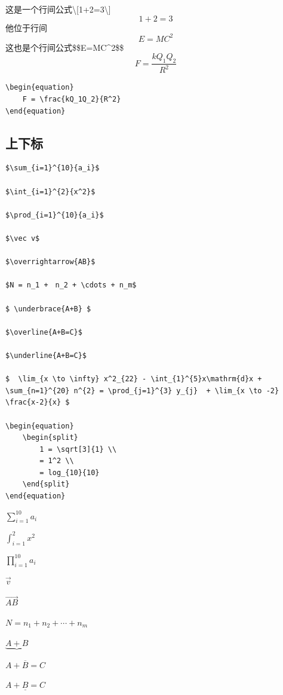 \documentclass{article}
\begin{document}
	\noindent 这是一个行间公式\textbackslash [1+2=3\textbackslash]\\
	\[1+2=3\] 他位于行间
	$$E=MC^2$$
	这也是个行间公式\$\$E=MC\^{}2\$\$
	\begin{equation}
		F = \frac{kQ_1Q_2}{R^2}
	\end{equation}
	\begin{lstlisting}
\begin{equation}
	F = \frac{kQ_1Q_2}{R^2}
\end{equation}
	\end{lstlisting}
	

	\subsection{上下标}
	\begin{lstlisting}
$\sum_{i=1}^{10}{a_i}$

$\int_{i=1}^{2}{x^2}$

$\prod_{i=1}^{10}{a_i}$

$\vec v$

$\overrightarrow{AB}$

$N = n_1 +　n_2 + \cdots + n_m$

$ \underbrace{A+B} $

$\overline{A+B=C}$

$\underline{A+B=C}$

$  \lim_{x \to \infty} x^2_{22} - \int_{1}^{5}x\mathrm{d}x + \sum_{n=1}^{20} n^{2} = \prod_{j=1}^{3} y_{j}  + \lim_{x \to -2} \frac{x-2}{x} $

\begin{equation}
	\begin{split}
		1 = \sqrt[3]{1} \\ 
		= 1^2 \\
		= log_{10}{10}
	\end{split}
\end{equation}
	\end{lstlisting}
	
	$\sum_{i=1}^{10}{a_i}$
	
	$\int_{i=1}^{2}{x^2}$
	
	$\prod_{i=1}^{10}{a_i}$
	
	$\vec v$
	
	$\overrightarrow{AB}$
	
	$N = n_1 +　n_2 + \cdots + n_m$
	
	$ \underbrace{A+B} $
	
	$\overline{A+B=C}$
	
	$\underline{A+B=C}$
	
\end{document}
